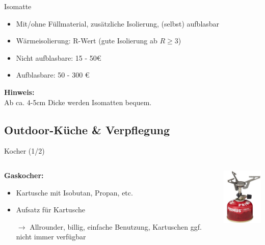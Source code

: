 \documentclass[aspectratio=169]{beamer}
\newcommand{\sarrow}{\small$\rightarrow$}
\newcommand{\tipp}[2][Tipp]{\vspace{0.2cm}\textbf{#1:}\\#2}
\begin{document}
			\begin{frame}{Isomatte}
				\begin{itemize}
					\item Mit/ohne Füllmaterial, zusätzliche Isolierung, (selbst) aufblasbar
					\item Wärmeisolierung: R-Wert (gute Isolierung ab $R \geq 3$)
					\item Nicht aufblasbare: 15 - 50€
					\item Aufblasbare: 50 - 300 €
				\end{itemize}\pause
				\tipp[Hinweis]{Ab ca. 4-5cm Dicke werden Isomatten bequem.}
			\end{frame}
			

		\subsection{Outdoor-Küche \& Verpflegung}
			
			\begin{frame}{Kocher (1/2)}
				\begin{columns}[c]
					\begin{column}{0.69\textwidth}
						\textbf{Gaskocher:}
						\begin{itemize}
							\item Kartusche mit Isobutan, Propan, etc.
							\item Aufsatz für Kartusche
							\item[\sarrow] Allrounder, billig, einfache Benutzung, Kartuschen ggf. nicht immer verfügbar
						\end{itemize}
					\end{column}
					\begin{column}{0.29\textwidth}
						\includegraphics[width=2.5cm]{images/kocher-gas.png}
					\end{column}
				\end{columns}
			\end{frame}
				
\end{document}
